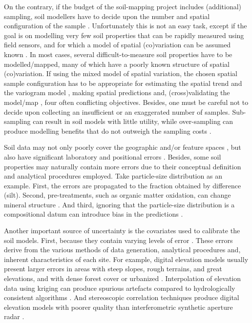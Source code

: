 On the contrary, if the budget of the soil-mapping project includes (additional) sampling, soil
modellers have to decide upon the number and spatial configuration of the sample
\cite{deGruijterEtAl2006,WebsterEtAl2013}. Unfortunately this is not an easy task, except if the
goal is on modelling very few soil properties that can be rapidly measured using field
sensors, and for which a model of spatial (co)variation can be assumed known \cite{MarchantEtAl2006}.
In most cases, several difficult-to-measure soil properties have to be modelled/mapped, many of
which have a poorly known structure of spatial (co)variation. If using the mixed model of spatial
variation, the chosen spatial sample configuration has to be appropriate for estimating the spatial
trend \cite{HenglEtAl2003a,MinasnyEtAl2006b} and the variogram model
\cite{WarrickEtAl1987,WebsterEtAl1992,Lark2002}, making spatial predictions
\cite{YfantisEtAl1987,WalvoortEtAl2010} and, (cross)validating the model/map \cite{BrusEtAl2011}, four
often conflicting objectives. Besides, one
must be careful not to decide upon collecting an insufficient or an exaggerated number of samples.
Sub-sampling can result in soil models with little utility, while over-sampling can produce
modelling benefits that do not outweigh the sampling costs \cite{vanGroenigenEtAl1999}.

Soil data may not only poorly cover the geographic and/or feature spaces \cite{HenglEtAl2003a}, but
also have significant laboratory and positional errors \cite{NelsonEtAl2011}. Besides, some soil
properties may naturally contain more errors due to their conceptual definition and analytical
procedures employed. Take particle-size distribution as an example. First, the errors are propagated
to the fraction obtained by difference (silt). Second, pre-treatments, such as organic matter
oxidation, can change mineral structure \cite{MikuttaEtAl2005a}. And third, ignoring that the
particle-size distribution is a compositional datum can introduce bias in the predictions
\cite{LarkEtAl2007}.

Another important source of uncertainty is the covariates used to calibrate the soil models.
First, because they contain varying levels of error \cite{HeuvelinkEtAl1989}. These errors derive
from the various methods of data generation, analytical procedures and, inherent characteristics of
each site. For example, digital elevation models usually present larger errors in areas with steep
slopes, rough terrains, and great elevations, and with dense forest cover or urbanized
\cite{Florinsky1998,Toutin2000,FisherEtAl2006}. Interpolation of elevation data using kriging
can produce spurious artefacts \cite{HenglEtAl2009} compared to hydrologically consistent
algorithms \cite{Hutchinson1989}. And stereoscopic correlation techniques produce digital elevation
models with poorer quality than interferometric synthetic aperture radar \cite{HirtEtAl2010}.


